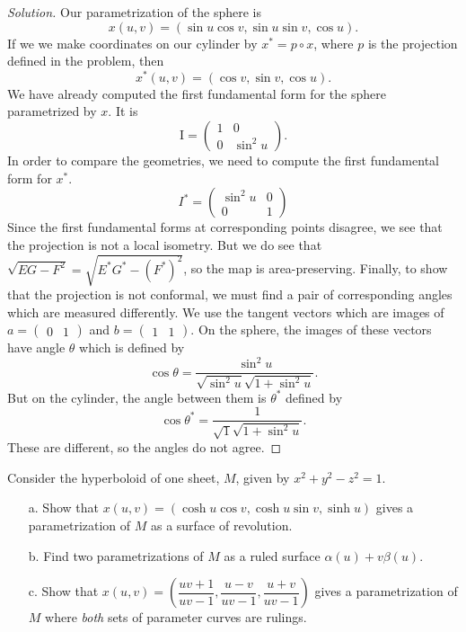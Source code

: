 \documentclass[Shifrin_Solutions_Spring_2018]{subfiles}
\begin{document}
\begin{proof}[Solution] Our parametrization of the sphere is
\[
x(u,v) = \left(\sin u \cos v , \sin u \sin v, \cos u \right).
\]
If we we make coordinates on our cylinder by $x^{\ast} = p\circ x$, where $p$ is the projection defined in the problem, then
\[
x^{\ast}(u,v) = \left( \cos v , \sin v, \cos u \right) .
\]
We have already computed the first fundamental form for the sphere parametrized by $x$. It is
\[
\mathrm{I} = \begin{pmatrix}
1 & 0 \\ 0 & \sin^2 u
\end{pmatrix}.
\]
In order to compare the geometries, we need to compute the first fundamental form for $x^{\ast}$.
\[
I^{\ast} = \begin{pmatrix}
\sin^2 u & 0 \\ 0 & 1
\end{pmatrix}
\]
Since the first fundamental forms at corresponding points disagree, we see that the projection is not a local isometry. But we do see that $\sqrt{EG-F^2} = \sqrt{E^{\ast}G^{\ast}-(F^{\ast})^2}$, so the map is area-preserving. Finally, to show that the projection is not conformal, we must find a pair of corresponding angles which are measured differently. We use the tangent vectors which are images of $a = \begin{pmatrix} 0 & 1\end{pmatrix}$ and $b= \begin{pmatrix} 1 & 1 \end{pmatrix}$. On the sphere, the images of these vectors have angle $\theta$ which is defined by
\[
\cos\theta = \dfrac{\sin^2 u}{\sqrt{\sin^2 u} \sqrt{1+\sin^2 u}}.
\]
But on the cylinder, the angle between them is $\theta^{\ast}$ defined by
\[
\cos\theta^{\ast} = \dfrac{1}{\sqrt{1}\sqrt{1+\sin^2 u}}.
\]
These are different, so the angles do not agree.
\end{proof}

\begin{exercise}
Consider the hyperboloid of one sheet, $M$, given by $x^2 +y^2-z^2 = 1$.
\begin{itemize}
\item[a.] Show that $x(u,v) = ( \cosh u \cos v , \cosh u \sin v , \sinh u )$ gives a parametrization of $M$ as a surface of revolution.

\item[b.] Find two parametrizations of $M$ as a ruled surface $\alpha(u) + v \beta(u)$.

\item[c.] Show that $x(u,v) = \left( \dfrac{uv+1}{uv-1}, \dfrac{u-v}{uv-1}, \dfrac{u+v}{uv-1} \right)$ gives a parametrization of $M$ where \emph{both} sets of parameter curves are rulings.
\end{itemize}
\end{exercise}
\end{document}
